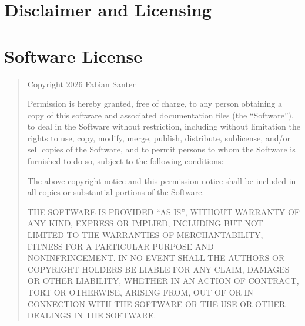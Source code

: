 \section{Disclaimer and Licensing }
\label{app:Licensing}
\appendix
\section{Software License}

\begin{quote}
\small\ttfamily
Copyright \textcopyright{} 2026 Fabian Santer

\medskip
Permission is hereby granted, free of charge, to any person obtaining a copy
of this software and associated documentation files (the ``Software''), to deal
in the Software without restriction, including without limitation the rights
to use, copy, modify, merge, publish, distribute, sublicense, and/or sell
copies of the Software, and to permit persons to whom the Software is
furnished to do so, subject to the following conditions:

\medskip
The above copyright notice and this permission notice shall be included in all
copies or substantial portions of the Software.

\medskip
THE SOFTWARE IS PROVIDED ``AS IS'', WITHOUT WARRANTY OF ANY KIND, EXPRESS OR
IMPLIED, INCLUDING BUT NOT LIMITED TO THE WARRANTIES OF MERCHANTABILITY,
FITNESS FOR A PARTICULAR PURPOSE AND NONINFRINGEMENT. IN NO EVENT SHALL THE
AUTHORS OR COPYRIGHT HOLDERS BE LIABLE FOR ANY CLAIM, DAMAGES OR OTHER
LIABILITY, WHETHER IN AN ACTION OF CONTRACT, TORT OR OTHERWISE, ARISING FROM,
OUT OF OR IN CONNECTION WITH THE SOFTWARE OR THE USE OR OTHER DEALINGS IN THE
SOFTWARE.
\end{quote}